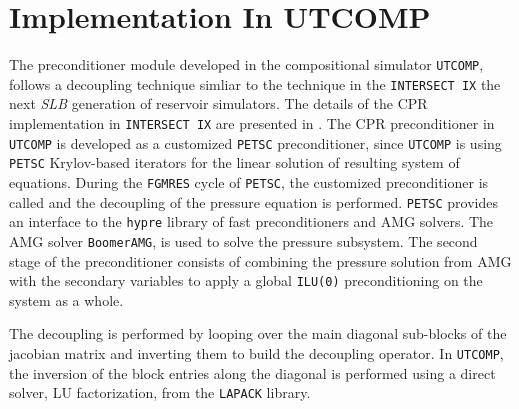\chapter{Implementation In UTCOMP}
The preconditioner module developed in the compositional simulator \texttt{UTCOMP}, follows a
decoupling technique simliar to the technique in the \texttt{INTERSECT IX} the next \textit{SLB}
generation of reservoir simulators. The details of the CPR implementation in \texttt{INTERSECT IX}
are presented in \cite{ix-cpr}. The CPR preconditioner in \texttt{UTCOMP} is developed as a customized
\texttt{PETSC} preconditioner, since \texttt{UTCOMP} is using \texttt{PETSC} Krylov-based iterators 
for the linear solution of resulting system of equations. During the \texttt{FGMRES} cycle of \texttt{PETSC}, 
the customized preconditioner is called and the decoupling of the pressure equation is performed. \texttt{PETSC}
provides an interface to the \texttt{hypre} library of fast preconditioners and AMG solvers\supercite{hypre}.
The AMG solver \texttt{BoomerAMG}\supercite{boomeramg}, is used to solve the pressure subsystem. The second stage
of the preconditioner consists of combining the pressure solution from AMG with the secondary variables to apply
a global \texttt{ILU(0)} preconditioning on the system as a whole. 

The decoupling is performed by looping over the main diagonal sub-blocks of the jacobian matrix 
and inverting them to build the decoupling operator. In \texttt{UTCOMP}, the inversion
of the block entries along the diagonal is performed using a direct solver, LU factorization, 
from the \texttt{LAPACK} library. 


